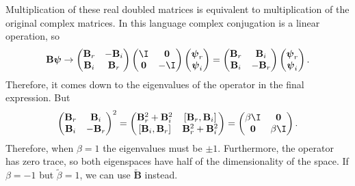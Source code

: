\documentclass[11pt]{article}
\newcommand{\B}{\mathbf{B}}
\newcommand{\Bt}{\widetilde{\mathbf{B}}}
\newcommand{\psib}{\boldsymbol{\psi}}
\newcommand{\betat}{\tilde{\beta}}
\begin{document}
%
Multiplication of these real doubled matrices is equivalent to multiplication of the original complex matrices.
In this language complex conjugation is a linear operation, so
%
\begin{equation*}
  \B \psib \to
         \begin{pmatrix}
           \B_r & -\B_i \\
           \B_i &  \B_r \\
         \end{pmatrix}
         \begin{pmatrix}
           \I  & \mathbf{0} \\
           \mathbf{0} & -\I   \\
         \end{pmatrix}
         \begin{pmatrix}
           \psib_r \\
           \psib_i \\
         \end{pmatrix}
  =
         \begin{pmatrix}
           \B_r &  \B_i \\
           \B_i & -\B_r \\
         \end{pmatrix}
         \begin{pmatrix}
           \psib_r \\
           \psib_i \\
         \end{pmatrix}.
\end{equation*}
%
Therefore, it comes down to the eigenvalues of the operator in the final expression.
But
%
\begin{equation*}
    \begin{pmatrix}
      \B_r &  \B_i \\
      \B_i & -\B_r \\
    \end{pmatrix}^2
  =
    \begin{pmatrix}
      \B_r^2 + \B_i^2 & [\B_r, \B_i]    \\
      [\B_i, \B_r]    & \B_r^2 + \B_i^2 \\
    \end{pmatrix}
  =
    \begin{pmatrix}
      \beta \I   & \mathbf{0} \\
      \mathbf{0} & \beta \I   \\
    \end{pmatrix}.
\end{equation*}
%
Therefore, when $\beta=1$ the eigenvalues must be $\pm 1$.
Furthermore, the operator has zero trace, so both eigenspaces have half of the dimensionality of the space.
If $\beta=-1$ but $\betat=1$, we can use $\Bt$ instead.
\end{document}
